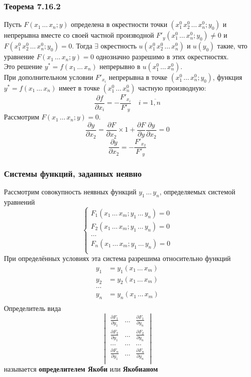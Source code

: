 \documentclass[12pt]{article}
\begin{document}
    \subsubsection*{Теорема 7.16.2}\label{th:7.16.2}
    Пусть $F(x_1\, \dots\, x_n; y)$ определена в окрестности точки $(x^0_1\, x^0_2\, \dots\, x^0_n; y_0)$ и непрерывна вместе со своей частной производной $F'_y(x^0_1\, \dots\, x^0_n; y_0) \ne 0$ и $F(x^0_1\, x^0_2\, \dots\, x^0_n; y_0) = 0$. Тогда $\exists$ окрестность $u(x^0_1\, x^0_2\, \dots\, x^0_n)$ и $u(y_0)$ такие, что уравнение $F(x_1\, \dots\, x_n; y) = 0$ однозначно разрешимо в этих окрестностях.\\
    Это решение $y^* = f(x_1\, \dots\, x_n)$ непрерывно в $u(x^0_1\, \dots\, x^0_n)$.\\
    При дополнительном условии $F'_{x_i}$ непрерывна в точке $(x^0_1\, \dots\, x^0_n; y_0)$, функция $y^* = f(x_1\, \dots\, x_n)$ имеет в точке $(x^0_1\, \dots\, x^0_n)$ частную производную:
    \[ \frac{\partial f}{\partial x_i} = -\frac{F'_{x_i}}{F'_{y}} \quad i = \overline{1,n} \]
    Рассмотрим $F(x_1\, \dots\, x_n; y) = 0$.
    \[ \frac{\partial y}{\partial x_2} = \frac{\partial F}{\partial x_2} \times 1 + \frac{\partial F}{\partial y}\frac{\partial y}{\partial x_2} = 0 \]
    \[ \frac{\partial y}{\partial x_2} = -\frac{F'_{x_2}}{F'_y} \]
    \subsubsection*{Системы функций, заданных неявно}\noindent
    Рассмотрим совокупность неявных функций $y_1\, \dots\, y_n$, определяемых системой уравнений
    \[ \begin{cases}
        F_1(x_1\, \dots\, x_m; y_1\, \dots\, y_n) = 0\\
        F_2(x_1\, \dots\, x_m; y_1\, \dots\, y_n) = 0\\
        \dots\\
        F_n(x_1\, \dots\, x_m; y_1\, \dots\, y_n) = 0\\
    \end{cases} \]
    При определённых условиях эта система разрешима относительно функций
    \[ \begin{aligned}
        y_1 &= y_1(x_1\, \dots\, x_m)\\
        y_2 &= y_2(x_1\, \dots\, x_m)\\
        \dots\\
        y_n &= y_n(x_1\, \dots\, x_m)\\
    \end{aligned} \]
    Определитель вида
    \[ 
        \begin{vmatrix}
            \frac{\partial F_1}{\partial y_1} & \dots & \frac{\partial F_1}{\partial y_n}\\
            \frac{\partial F_2}{\partial y_1} & \dots & \frac{\partial F_2}{\partial y_n}\\
            \dots & \dots & \dots\\
            \frac{\partial F_n}{\partial y_1} & \dots & \frac{\partial F_n}{\partial y_n}\\
        \end{vmatrix}
    \]
    называется \textbf{определителем Якоби} или \textbf{Якобианом}
\end{document}
